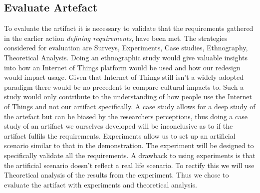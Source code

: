 \subsection{Evaluate Artefact}
To evaluate the artifact it is necessary to validate that the requirements gathered in the earlier action \emph{defining requirements}, have been met. The strategies considered for evaluation are Surveys, Experiments, Case studies, Ethnography, Theoretical Analysis. 
Doing an ethnographic study would give valuable insights into how an Internet of Things platform would be used and how our redesign would impact usage. Given that Internet of Things still isn't a widely adopted paradigm there would be no precedent to compare cultural impacts to. Such a study would only contribute to the understanding of how people use the Internet of Things and not our artifact specifically. A case study allows for a deep study of the artefact but can be biased by the researchers perceptions, thus doing a case study of an artifact we ourselves developed will be inconclusive as to if the artifact fulfils the requirements.
Experiments allow us to set up an artificial scenario similar to that in the demonstration. The experiment will be designed to specifically validate all the requirements. A drawback to using experiments is that the artificial scenario doesn't reflect a real life scenario. To rectify this we will use Theoretical analysis of the results from the experiment. Thus we chose to evaluate the artifact with experiments and theoretical analysis.
